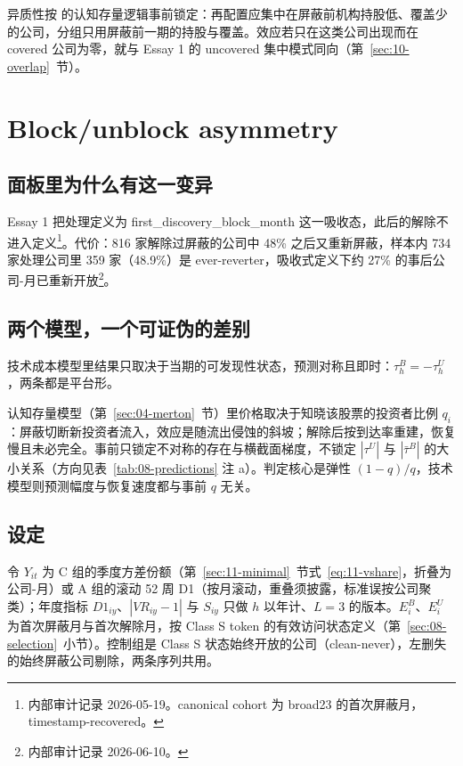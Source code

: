 \documentclass[a4paper,11pt]{ctexart}
\begin{document}
异质性按 \citet{merton1987} 的认知存量逻辑事前锁定：再配置应集中在屏蔽前机构持股低、覆盖少的公司，分组只用屏蔽前一期的持股与覆盖。效应若只在这类公司出现而在 covered 公司为零，就与 Essay 1 的 uncovered 集中模式同向（第~\ref{sec:10-overlap}~节）。
\clearpage

\section{Block/unblock asymmetry}\label{sec:08-asymmetry}

\subsection{面板里为什么有这一变异}\label{sec:08-why}

Essay 1 把处理定义为 first\_discovery\_block\_month 这一吸收态，此后的解除不进入定义\footnote{内部审计记录 2026-05-19。canonical cohort 为 broad23 的首次屏蔽月，timestamp-recovered。}。代价：816 家解除过屏蔽的公司中 48\% 之后又重新屏蔽，样本内 734 家处理公司里 359 家（48.9\%）是 ever-reverter，吸收式定义下约 27\% 的事后公司-月已重新开放\footnote{内部审计记录 2026-06-10。}。

\subsection{两个模型，一个可证伪的差别}\label{sec:08-models}

技术成本模型里结果只取决于当期的可发现性状态，预测对称且即时：$\tau^{B}_h=-\tau^{U}_h$，两条都是平台形。

认知存量模型（第~\ref{sec:04-merton}~节）里价格取决于知晓该股票的投资者比例 $q_i$\citep{merton1987}：屏蔽切断新投资者流入，效应是随流出侵蚀的斜坡；解除后按到达率重建，恢复慢且未必完全。事前只锁定不对称的存在与横截面梯度，不锁定 $|\tau^{U}|$ 与 $|\bar\tau^{B}|$ 的大小关系（方向见表~\ref{tab:08-predictions} 注 a）。判定核心是弹性 $(1-q)/q$，技术模型则预测幅度与恢复速度都与事前 $q$ 无关。

\subsection{设定}\label{sec:08-setup}

令 $Y_{it}$ 为 C 组的季度方差份额（第~\ref{sec:11-minimal}~节式~\eqref{eq:11-vshare}，折叠为公司-月）或 A 组的滚动 52 周 D1（按月滚动，重叠须披露，标准误按公司聚类）；年度指标 $D1_{iy}$、$|VR_{iy}-1|$ 与 $S_{iy}$ 只做 $h$ 以年计、$L=3$ 的版本。$E^{B}_i$、$E^{U}_i$ 为首次屏蔽月与首次解除月，按 Class S token 的有效访问状态定义（第~\ref{sec:08-selection}~小节）。控制组是 Class S 状态始终开放的公司（clean-never），左删失的始终屏蔽公司剔除，两条序列共用。
\end{document}
